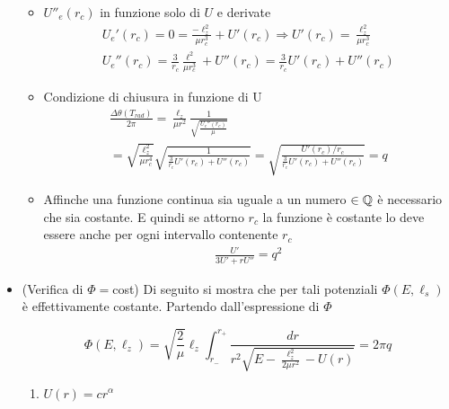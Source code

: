 \documentclass[Main.tex]{subfiles}
\begin{document}
\begin{dm}
\begin{itemize}
\begin{itemize}
		\item $U''_e(r_c)$ in funzione solo di $U$ e derivate
		\begin{gather*}
			U_e'(r_c) = 0 = \frac{-\ell_z^2}{\mu r_c^3} + U'(r_c) \Rightarrow \boxed{U'(r_c) = \frac{\ell_z^2}{\mu r_c^3}}\\
			U_e'' (r_c) = \frac{3}{r_c} \frac{\ell^2}{\mu r_c^3} +U''(r_c) = \boxed{\frac{3}{r_c} U'(r_c) + U''(r_c)}
		\end{gather*}
		\item Condizione di chiusura in funzione di U
		\begin{gather*}
			\frac{\Delta \theta (T_{rad})}{ 2 \pi} = \frac{\ell_z}{\mu r^2} \frac{1}{\sqrt{\frac{U_e''(r_c)}{\mu}}}\\
			=\sqrt{\frac{\ell_z^2}{\mu r_c^4}} \sqrt{\frac{1}{\frac{3}{r_c}U'(r_c) + U''(r_c)}}= \boxed{\sqrt{\frac{U'(r_c)/r_c}{\frac{3}{r_c}U'(r_c) + U''(r_c)}}=q}
		\end{gather*}
		\item Affinche una funzione continua sia uguale a un numero $\in \mathbb{Q}$ è necessario che sia costante. E quindi se attorno $r_c$ la funzione è costante lo deve essere anche per ogni intervallo contenente $r_c$
		\begin{gather}
			\frac{U'}{3U' + rU''}=q^2
		\end{gather}
	\end{itemize}
	
	\item (Verifica di $\Phi=$cost) Di seguito si mostra che per tali potenziali $\Phi(E, \ell_s)$ è effettivamente costante.  Partendo dall'espressione di $\Phi$

\begin{equation}
  \Phi (E,\ell_z) =\sqrt{\frac{2}{\mu}} \ell_z  \int_{r_-}^{r_+}  \frac{dr}{r^2 \sqrt{E-
 \frac{\ell_z^2}{2 \mu r^2} -U(r)}}= 2 \pi q
\end{equation}
	
\begin{enumerate}
	\item $\boxed{U(r)=cr^\alpha}$
	

\end{enumerate}
\end{itemize}
\end{dm}
\end{document}
